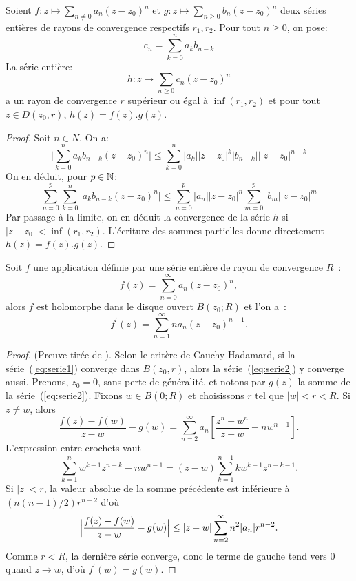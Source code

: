 \begin{fprop}
Soient $f \colon z \mapsto \sum_{n \neq 0}a_n(z-z_0)^n$ et $g \colon z \mapsto \sum_{n \geq 0} b_n (z-z_0)^n$ deux séries entières de rayons de convergence respectifs $r_1,r_2$. 
Pour tout $n \geq 0$, on pose:
\[
c_n = \sum_{k=0}^n a_k b_{n-k}
\]
La série entière:
\[
h \colon z \mapsto \sum_{n \geq 0} c_n (z-z_0)^n
\]
a un rayon de convergence $r$ supérieur ou égal à $\inf(r_1,r_2)$ et pour tout $z \in D(z_0,r), \, h(z) = f(z).g(z)$.
\end{fprop}
\begin{proof}
Soit $n \in N$. On a:
\[
\lvert \sum_{k=0}^n a_k b_{n-k} (z-z_0)^n\rvert \leq \sum_{k=0}^n \lvert a_k\rvert\lvert z- z_0\rvert^k \lvert b_{n-k}\rvert \lvert|z-z_0|^{n-k}
\]
On en déduit, pour $p \in {\mathbb N}$:
\[
\sum_{n = 0}^p  \sum_{k=0}^n \lvert a_k b_{n-k} (z-z_0)^n\rvert \leq \sum_{n=0}^p |a_n| |z-z_0|^n \sum_{m=0}^p |b_m||z-z_0|^m
\]
Par passage à la limite, on en déduit la convergence de la série $h$ si $|z-z_0| < \inf(r_1,r_2)$. L'écriture des sommes partielles donne directement $h(z)=f(z).g(z)$.
\end{proof}
\begin{fthm}
Soit $f$ une application définie par une série entière de rayon de
convergence $R$~:
\begin{equation}\label{eq:serie1}
f(z) = \sum_{n =0}^\infty a_n (z-z_0)^n,
\end{equation}
alors $f$ est holomorphe dans le disque ouvert $B(z_0 ; R)$ et l'on a~:
\begin{equation}\label{eq:serie2}
f^\prime(z) = \sum_{n = 1}^\infty n a_{n} (z-z_0)^{n-1}.
\end{equation}
\end{fthm}
\begin{proof}{(Preuve tirée de \cite{rudin1988analyse}).}
Selon le critère de Cauchy-Hadamard, si la série~(\ref{eq:serie1}) converge dans $B(z_0,r)$, alors la série~(\ref{eq:serie2}) y converge aussi. 
Prenons, $z_0=0$, sans perte de généralité, et notons par $g(z)$ la somme de la série~(\ref{eq:serie2}). Fixons $w \in B(0 ; R)$ et choisissons $r$ tel que $\lvert w \rvert < r <R$. Si $z \neq w$, alors
\[\frac{f(z) - f(w)}{z-w}-g(w)=\sum_{n=2}^\infty a_n \left[  \frac{z^n-w^n}{z-w} - n w^{n-1}\right].\]
L'expression entre crochets vaut
\[\sum_{k=1}^n w^{k-1}z^{n-k} - n w^{n-1} = (z-w) \sum_{k=1}^{n-1} k w^{k-1}z^{n-k-1}.\]
Si $\lvert z \rvert <r$, la valeur absolue de la somme précédente est inférieure à $\left(n(n-1)/2\right) r^{n-2}$
d'où
\[\Bigl | \frac{f(z) - f(w)}{z-w}-g(w) \Bigr |  \leq \lvert z-w \rvert \sum_{n=2}^\infty n^2 \lvert a_n \rvert r^{n-2}.\]
Comme $r<R$, la dernière série converge, donc le terme de gauche tend vers $0$ quand $z \to w$, d'où $f^\prime(w)=g(w)$. 
\end{proof}

